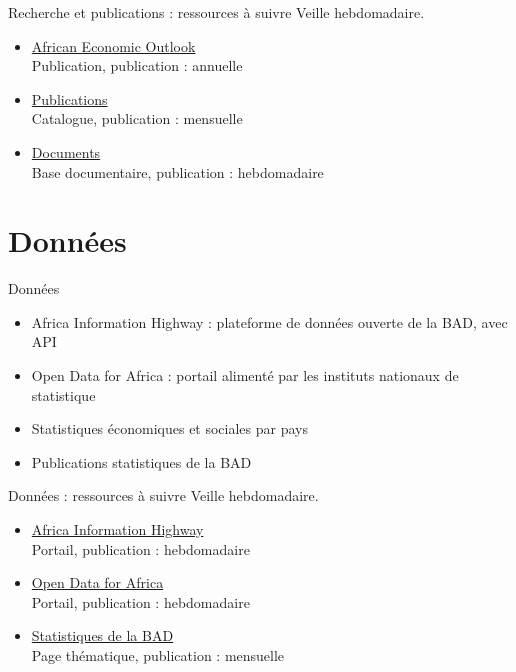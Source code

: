 \documentclass[aspectratio=169,11pt]{beamer}
\begin{document}
\begin{frame}{Recherche et publications : ressources à suivre}
\small
Veille hebdomadaire.
\begin{itemize}
\item \href{https://www.afdb.org/en/knowledge/publications/african-economic-outlook}{African Economic Outlook}\\{\footnotesize Publication, publication : annuelle}
\item \href{https://www.afdb.org/en/knowledge/publications}{Publications}\\{\footnotesize Catalogue, publication : mensuelle}
\item \href{https://www.afdb.org/en/documents}{Documents}\\{\footnotesize Base documentaire, publication : hebdomadaire}
\end{itemize}
\end{frame}

\section{Données}
\begin{frame}{Données}
\begin{itemize}
\item Africa Information Highway : plateforme de données ouverte de la BAD, avec API
\item Open Data for Africa : portail alimenté par les instituts nationaux de statistique
\item Statistiques économiques et sociales par pays
\item Publications statistiques de la BAD
\end{itemize}
\end{frame}

\begin{frame}{Données : ressources à suivre}
\small
Veille hebdomadaire.
\begin{itemize}
\item \href{https://africaninfohighway.afdb.org}{Africa Information Highway}\\{\footnotesize Portail, publication : hebdomadaire}
\item \href{https://dataportal.opendataforafrica.org}{Open Data for Africa}\\{\footnotesize Portail, publication : hebdomadaire}
\item \href{https://www.afdb.org/en/knowledge/statistics}{Statistiques de la BAD}\\{\footnotesize Page thématique, publication : mensuelle}
\end{itemize}
\end{frame}
\end{document}
